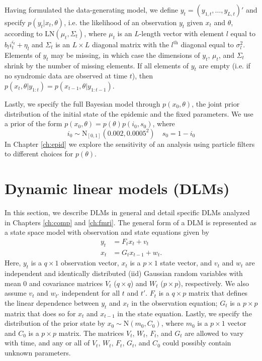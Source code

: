 Having formulated the data-generating model, we define $y_t = (y_{1,t},\ldots,y_{L,t})'$ and specify $p(y_t|x_t,\theta)$, i.e. the likelihood of an observation $y_t$ given $x_t$ and $\theta$, according to $\mbox{LN}(\mu_t,\Sigma_t)$, where $\mu_t$ is an $L$-length vector with element $l$ equal to $b_li_t^{\varsigma_l} + \eta_l$ and $\Sigma_t$ is an $L \times L$ diagonal matrix with the $l^{\mbox{th}}$ diagonal equal to $\sigma_l^2$. Elements of $y_t$ may be missing, in which case the dimensions of $y_t$, $\mu_t$, and $\Sigma_t$ shrink by the number of missing elements. If all elements of $y_t$ are empty (i.e. if no syndromic data are observed at time $t$), then $p(x_t,\theta|y_{1:t})=p(x_{t-1},\theta|y_{1:t-1})$.

Lastly, we specify the full Bayesian model through $p(x_0, \theta)$, the joint prior distribution of the initial state of the epidemic and the fixed parameters. We use a prior of the form $p(x_0,\theta) = p(\theta)p(i_0,s_0)$, where
\begin{equation}
i_0 \sim \mbox{N}_{[0,1]}(0.002,0.0005^2) \quad s_0 = 1 - i_0 \label{eqn:epid:prior}
\end{equation}
In Chapter \ref{ch:epid} we explore the sensitivity of an analysis using particle filters to different choices for $p(\theta)$.

\section{Dynamic linear models (DLMs) \label{sec:dlm}}

In this section, we describe DLMs in general and detail specific DLMs analyzed in Chapters \ref{ch:comp} and \ref{ch:fmri}. The general form of a DLM is represented as a state space model with observation and state equations given by
\begin{align}
y_t &= F_tx_t + v_t \label{eqn:dlm:obs} \\
x_t &= G_tx_{t-1} + w_t. \label{eqn:dlm:state}
\end{align}
Here, $y_t$ is a $q \times 1$ observation vector, $x_t$ is a $p \times 1$ state vector, and $v_t$ and $w_t$ are independent and identically distributed (iid) Gaussian random variables with mean 0 and covariance matrices $V_t$ ($q \times q$) and $W_t$ ($p \times p$), respectively. We also assume $v_t$ and $w_{t'}$ independent for all $t$ and $t'$. $F_t$ is a $q \times p$ matrix that defines the linear dependence between $y_t$ and $x_t$ in the observation equation; $G_t$ is a $p \times p$ matrix that does so for $x_t$ and $x_{t-1}$ in the state equation. Lastly, we specify the distribution of the prior state by $x_0 \sim \mbox{N}(m_0, C_0)$, where $m_0$ is a $p \times 1$ vector and $C_0$ is a $p \times p$ matrix. The matrices $V_t$, $W_t$, $F_t$, and $G_t$ are allowed to vary with time, and any or all of $V_t$, $W_t$, $F_t$, $G_t$, and $C_0$ could possibly contain unknown parameters.

